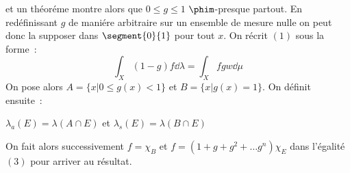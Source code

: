 et un théoréme montre alors que $0\leq g\leq 1$ $\phim$-presque partout. En redéfinissant $g$ de maniére arbitraire
sur un ensemble de mesure nulle on peut donc la supposer dans $\segment{0}{1}$ pour tout $x$. On récrit $(1)$ sous la
forme~:
\begin{equation}
\int_X (1-g)f\dd{\lambda} = \int_X fgw\dd{\mu}
\end{equation}
On pose alors $A = \lbrace x| 0\leq g(x)<1\rbrace$ et $B = \lbrace x| g(x) = 1\rbrace$. On définit ensuite~:\par
\centerline{$\lambda_a(E) = \lambda (A\cap E)$ et $\lambda_s (E) = \lambda (B\cap E)$}\par
On fait alors successivement $f = \chi_B$ et $f = (1+g+g^2 +\ldots g^n)\chi_E$ dans l'égalité $(3)$ pour arriver au 
résultat.\par








